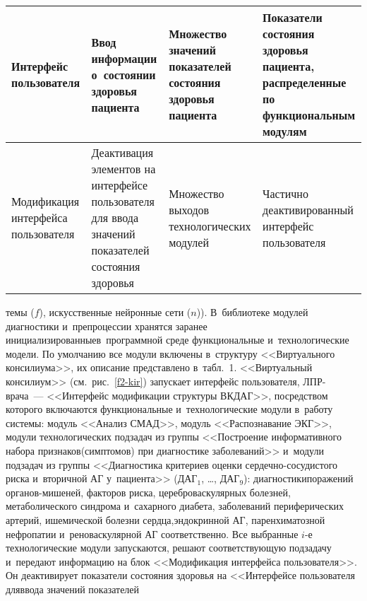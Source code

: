 \begin{table*}
\begin{center}
\begin{tabular}{|p{30mm}|p{40mm}|p{39mm}|p{39mm}|}
\hline
Интерфейс пользователя &Ввод информации о~со\-сто\-янии здоровья пациента &
Множество значений 
показателей состояния здоровья пациента&
Показатели состояния здоровья пациента, распределенные по 
функциональным модулям \\
\hline
Модификация интерфейса пользователя&Деактивация элементов на интерфейсе пользователя для ввода 
значений показателей состояния здоровья&Множество выходов технологических модулей&Частично 
деактивированный интерфейс пользователя \\
\hline
\end{tabular}
\end{center}
\end{table*}

\begin{multicols}{2}

\noindent 
те\-мы ($f$), искусственные нейронные сети ($n$)).
 В~библиотеке модулей диагностики 
и~препро\-цессии хранятся заранее инициализированные\linebreak в~программной среде 
функциональные и~технологические модели. 
По умолчанию все модули включены 
в~структуру <<Виртуального консилиума>>, их описание пред\-став\-ле\-но в~табл.~1. %
%
      <<Виртуальный консилиум>> (см.\ рис.~\ref{f2-kir}) запускает интерфейс пользователя, 
ЛПР-вра\-ча~--- <<{Интерфейс модификации структуры ВКДАГ}>>, посредством 
которого включаются функциональные 
 и~технологические модули в~работу сис\-те\-мы: модуль 
<<Анализ СМАД>>, модуль <<Распознавание ЭКГ>>, модули технологических подзадач из 
группы <<Построение информативного набора признаков\linebreak (симптомов) при диагностике 
заболеваний>> и~модули подзадач из группы <<Диагностика критериев оценки 
сер\-деч\-но-со\-су\-ди\-сто\-го риска и~вторичной АГ у~пациента>> ({ДАГ}$_1$, \ldots , {ДАГ}$_9$): 
диагностики\linebreak поражений ор\-га\-нов-ми\-ше\-ней, факторов риска, цереброваскулярных 
болезней, метаболического синд\-ро\-ма и~сахарного диабета, заболеваний периферических 
артерий, ишемической болезни сердца,\linebreak эндокринной АГ, паренхиматозной нефропатии 
и~реноваскулярной АГ соответственно. Все выбранные $i$-е технологические модули 
запускаются, решают соответствующую подзадачу и~передают информацию на блок 
<<{Модификация интерфейса пользователя}>>. Он деактивирует показатели 
со\-сто\-яния здоровья на <<{Интерфейсе пользователя для\linebreak ввода значений показателей 
}
\end{multicols}
